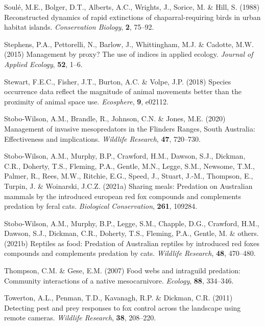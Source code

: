 \documentclass[]{elsarticle} %
\begin{document}
\leavevmode\hypertarget{ref-soule1988reconstructed}{}%
Soulé, M.E., Bolger, D.T., Alberts, A.C., Wrights, J., Sorice, M. \& Hill, S. (1988) Reconstructed dynamics of rapid extinctions of chaparral-requiring birds in urban habitat islands. \emph{Conservation Biology}, \textbf{2}, 75--92.

\leavevmode\hypertarget{ref-stephens2015management}{}%
Stephens, P.A., Pettorelli, N., Barlow, J., Whittingham, M.J. \& Cadotte, M.W. (2015) Management by proxy? The use of indices in applied ecology. \emph{Journal of Applied Ecology}, \textbf{52}, 1--6.

\leavevmode\hypertarget{ref-stewart2018species}{}%
Stewart, F.E.C., Fisher, J.T., Burton, A.C. \& Volpe, J.P. (2018) Species occurrence data reflect the magnitude of animal movements better than the proximity of animal space use. \emph{Ecosphere}, \textbf{9}, e02112.

\leavevmode\hypertarget{ref-stobo2020management}{}%
Stobo-Wilson, A.M., Brandle, R., Johnson, C.N. \& Jones, M.E. (2020) Management of invasive mesopredators in the Flinders Ranges, South Australia: Effectiveness and implications. \emph{Wildlife Research}, \textbf{47}, 720--730.

\leavevmode\hypertarget{ref-stobo2021sharing}{}%
Stobo-Wilson, A.M., Murphy, B.P., Crawford, H.M., Dawson, S.J., Dickman, C.R., Doherty, T.S., Fleming, P.A., Gentle, M.N., Legge, S.M., Newsome, T.M., Palmer, R., Rees, M.W., Ritchie, E.G., Speed, J., Stuart, J.-M., Thompson, E., Turpin, J. \& Woinarski, J.C.Z. (2021a) Sharing meals: Predation on Australian mammals by the introduced european red fox compounds and complements predation by feral cats. \emph{Biological Conservation}, \textbf{261}, 109284.

\leavevmode\hypertarget{ref-stobo2021reptiles}{}%
Stobo-Wilson, A.M., Murphy, B.P., Legge, S.M., Chapple, D.G., Crawford, H.M., Dawson, S.J., Dickman, C.R., Doherty, T.S., Fleming, P.A., Gentle, M. \& others. (2021b) Reptiles as food: Predation of Australian reptiles by introduced red foxes compounds and complements predation by cats. \emph{Wildlife Research}, \textbf{48}, 470--480.

\leavevmode\hypertarget{ref-thompson2007food}{}%
Thompson, C.M. \& Gese, E.M. (2007) Food webs and intraguild predation: Community interactions of a native mesocarnivore. \emph{Ecology}, \textbf{88}, 334--346.

\leavevmode\hypertarget{ref-towerton2011detecting}{}%
Towerton, A.L., Penman, T.D., Kavanagh, R.P. \& Dickman, C.R. (2011) Detecting pest and prey responses to fox control across the landscape using remote cameras. \emph{Wildlife Research}, \textbf{38}, 208--220.
\end{document}
